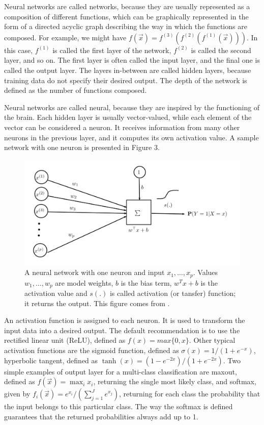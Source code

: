\documentclass[12pt]{article}
\begin{document}
Neural networks are called networks, because they are usually represented as a composition of different functions, which can be graphically represented in the form of a directed acyclic graph describing the way in which the functions are composed. For example, we might have $f(\vec{x})=f^{(3)}(f^{(2)}(f^{(1)}(\vec{x})))$. In this case, $f^{(1)}$ is called the first layer of the network, $f^{(2)}$ is called the second layer, and so on. The first layer is often called the input layer, and the final one is called the output layer. The layers in-between are called hidden layers, because training data do not specify their desired output. The depth of the network is defined as the number of functions composed. 


Neural networks are called neural, because they are inspired by the functioning of the brain. Each hidden layer is usually vector-valued, while each element of the vector can be considered a neuron.  It receives information from many other neurons in the previous layer, and it computes its own activation value.  A sample network with one neuron is presented in Figure 3. 

\begin{figure}[h!]
\centering
\includegraphics[scale = 0.3]{NN.png}
\caption{A neural network with one neuron and input $x_1,\ldots, x_p$. Values $w_1,\ldots, w_p$ are model weights, $b$ is the bias term, $w^Tx + b$ is the activation value and $s(.)$ is called activation (or tansfer) function; it returns the output. This figure comes from \citep{lectures}. }
\end{figure}

An activation function is assigned to each neuron. It is used to transform the input data into a desired output. The default recommendation is to use the rectified linear unit (ReLU), defined as $f(x) = max \{0,x\}$. Other typical activation functions are the sigmoid function, defined as $\sigma(x) = 1 / (1 + e^{-x})$, hyperbolic tangent, defined as $\tanh(x) = (1-e^{-2x}) / (1 + e^{-2x})$. 
Two simple examples of output layer for a multi-class classification are maxout, defined as $f(\vec{x}) = \max_i x_i$, returning the single most likely class, and softmax, given by $f_i(\vec{x}) = e^{x_i}/(\sum_{j=1}^J e^{x_j})$, returning for each class the probability that the input belongs to this particular class. The way the softmax is defined guarantees that the returned probabilities always add up to 1. 
\end{document}
